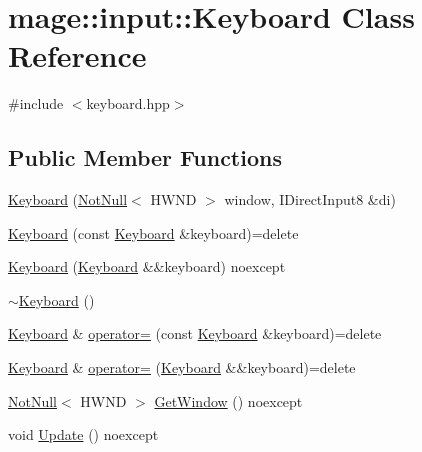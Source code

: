 \hypertarget{classmage_1_1input_1_1_keyboard}{}\section{mage\+:\+:input\+:\+:Keyboard Class Reference}
\label{classmage_1_1input_1_1_keyboard}


{\ttfamily \#include $<$keyboard.\+hpp$>$}

\subsection*{Public Member Functions}
\begin{DoxyCompactItemize}
\item 
\mbox{\hyperlink{classmage_1_1input_1_1_keyboard_af9ac64b485a4fdca497d007283faca18}{Keyboard}} (\mbox{\hyperlink{namespacemage_a8769f9d670d6b585ea306cb1062af94b}{Not\+Null}}$<$ H\+W\+ND $>$ window, I\+Direct\+Input8 \&di)
\item 
\mbox{\hyperlink{classmage_1_1input_1_1_keyboard_ae7297c3080b0e6f78e37cf94ce3effcb}{Keyboard}} (const \mbox{\hyperlink{classmage_1_1input_1_1_keyboard}{Keyboard}} \&keyboard)=delete
\item 
\mbox{\hyperlink{classmage_1_1input_1_1_keyboard_adb93a42b959d58fc320215157f85854c}{Keyboard}} (\mbox{\hyperlink{classmage_1_1input_1_1_keyboard}{Keyboard}} \&\&keyboard) noexcept
\item 
\mbox{\hyperlink{classmage_1_1input_1_1_keyboard_a71239cd5326f78ab226f145a430b382b}{$\sim$\+Keyboard}} ()
\item 
\mbox{\hyperlink{classmage_1_1input_1_1_keyboard}{Keyboard}} \& \mbox{\hyperlink{classmage_1_1input_1_1_keyboard_a8a06eeb906625f100928f3fe2d17cf9d}{operator=}} (const \mbox{\hyperlink{classmage_1_1input_1_1_keyboard}{Keyboard}} \&keyboard)=delete
\item 
\mbox{\hyperlink{classmage_1_1input_1_1_keyboard}{Keyboard}} \& \mbox{\hyperlink{classmage_1_1input_1_1_keyboard_a7dc2316d53a043fa42e4909bd8e58bb9}{operator=}} (\mbox{\hyperlink{classmage_1_1input_1_1_keyboard}{Keyboard}} \&\&keyboard)=delete
\item 
\mbox{\hyperlink{namespacemage_a8769f9d670d6b585ea306cb1062af94b}{Not\+Null}}$<$ H\+W\+ND $>$ \mbox{\hyperlink{classmage_1_1input_1_1_keyboard_a9838f6a7453f74d545926bf5de4c7750}{Get\+Window}} () noexcept
\item 
void \mbox{\hyperlink{classmage_1_1input_1_1_keyboard_a14e53eed6b75a2c45ca3caf94d797bc0}{Update}} () noexcept

\end{DoxyCompactItemize}
